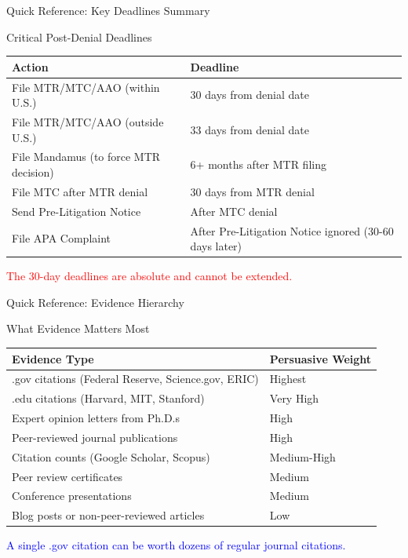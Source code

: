 \documentclass[11pt]{beamer}
\begin{document}
	\begin{frame}{Quick Reference: Key Deadlines Summary}
		\scriptsize
		\begin{block}{Critical Post-Denial Deadlines}
			\centering
			\begin{tabular}{|p{5cm}|p{4cm}|}
				\hline
				\textbf{Action} & \textbf{Deadline} \\
				\hline
				File MTR/MTC/AAO (within U.S.) & 30 days from denial date \\
				\hline
				File MTR/MTC/AAO (outside U.S.) & 33 days from denial date \\
				\hline
				File Mandamus (to force MTR decision) & 6+ months after MTR filing \\
				\hline
				File MTC after MTR denial & 30 days from MTR denial \\
				\hline
				Send Pre-Litigation Notice & After MTC denial \\
				\hline
				File APA Complaint & After Pre-Litigation Notice ignored (30-60 days later) \\
				\hline
			\end{tabular}
			\vspace{0.2cm}
			\textcolor{red}{The 30-day deadlines are absolute and cannot be extended.}
		\end{block}
	\end{frame}
	
	\begin{frame}{Quick Reference: Evidence Hierarchy}
		\scriptsize
		\begin{block}{What Evidence Matters Most}
			\centering
			\begin{tabular}{|p{5cm}|p{4cm}|}
				\hline
				\textbf{Evidence Type} & \textbf{Persuasive Weight} \\
				\hline
				.gov citations (Federal Reserve, Science.gov, ERIC) & Highest \\
				\hline
				.edu citations (Harvard, MIT, Stanford) & Very High \\
				\hline
				Expert opinion letters from Ph.D.s & High \\
				\hline
				Peer-reviewed journal publications & High \\
				\hline
				Citation counts (Google Scholar, Scopus) & Medium-High \\
				\hline
				Peer review certificates & Medium \\
				\hline
				Conference presentations & Medium \\
				\hline
				Blog posts or non-peer-reviewed articles & Low \\
				\hline
			\end{tabular}
			\vspace{0.2cm}
			\textcolor{blue}{A single .gov citation can be worth dozens of regular journal citations.}
		\end{block}
	\end{frame}
	
\end{document}
